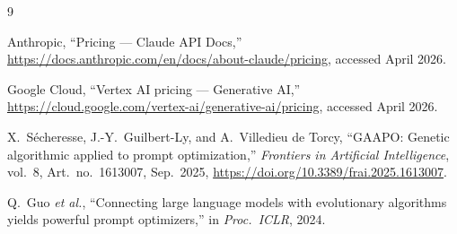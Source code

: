 \documentclass[11pt,a4paper]{report}
\begin{document}
\begin{thebibliography}{9}

Anthropic, ``Pricing --- Claude API Docs,''
\url{https://docs.anthropic.com/en/docs/about-claude/pricing},
accessed April 2026.

Google Cloud, ``Vertex AI pricing --- Generative AI,''
\url{https://cloud.google.com/vertex-ai/generative-ai/pricing},
accessed April 2026.

X.~S\'{e}cheresse, J.-Y.~Guilbert-Ly, and A.~Villedieu de Torcy,
``GAAPO: Genetic algorithmic applied to prompt optimization,''
\emph{Frontiers in Artificial Intelligence}, vol.~8, Art.~no.~1613007, Sep.~2025,
\url{https://doi.org/10.3389/frai.2025.1613007}.

Q.~Guo \emph{et al.},
``Connecting large language models with evolutionary algorithms yields powerful prompt optimizers,''
in \emph{Proc.\ ICLR}, 2024.

\end{thebibliography}
\end{document}
